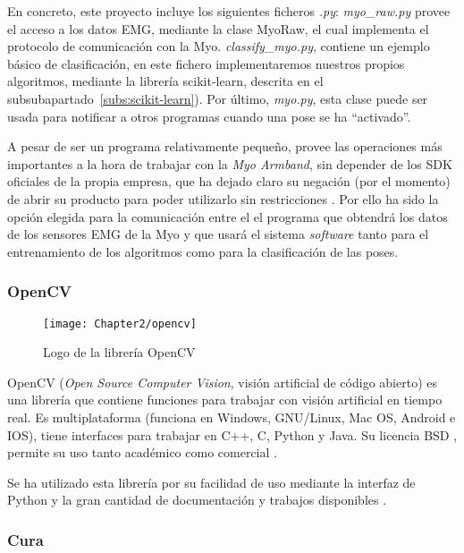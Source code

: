 En concreto, este proyecto incluye los siguientes ficheros \textit{.py}:
\textit{myo\_raw.py} provee el acceso a los datos EMG, mediante la clase
MyoRaw, el cual implementa el protocolo de comunicación con la Myo.
\textit{classify\_myo.py}, contiene un ejemplo básico de clasificación, en este
fichero implementaremos nuestros propios algoritmos, mediante la librería scikit-learn,
descrita en el subsubapartado~\ref{subs:scikit-learn}). Por último, \textit{myo.py},
esta clase puede ser usada para notificar a otros programas cuando una pose se ha
``activado''.

A pesar de ser un programa relativamente pequeño, provee las operaciones más importantes
a la hora de trabajar con la \textit{Myo Armband}, sin depender de los SDK
oficiales de la propia empresa, que ha dejado claro su negación (por el momento)
de abrir su producto para poder utilizarlo sin restricciones \cite{myo-close}.
Por ello ha sido la opción elegida para la comunicación entre el el programa que
obtendrá los datos de los sensores EMG de la Myo y que usará el sistema \textit{software}
tanto para el entrenamiento de los algoritmos como para la clasificación de las
poses.


\subsubsection{OpenCV}
\label{subs:opencv}

\begin{figure}[htp]
  \centering
    \texttt{[image: Chapter2/opencv]}
  \caption{Logo de la librería OpenCV}
\label{fig:opencv}
\end{figure}

OpenCV (\textit{Open Source Computer Vision}, visión artificial de código abierto) es una librería que contiene 
funciones para trabajar con visión artificial en tiempo real. Es multiplataforma (funciona en Windows, GNU/Linux,
Mac OS, Android e IOS), tiene interfaces para trabajar en C++, C, Python y Java. Su licencia BSD \cite{bsd},
permite su uso tanto 
académico como comercial \cite{opencv}.

Se ha utilizado esta librería por su facilidad de uso mediante la interfaz de Python y la gran cantidad de 
documentación y trabajos disponibles \cite{opencv-python}.




\subsubsection{Cura}
\label{subs:cura}


